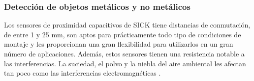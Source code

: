 %

\subsubsection{Detección de objetos metálicos y no metálicos}
\label{sec:sensores:cap:deteccion}

Los sensores de proximidad capacitivos de SICK tiene distancias de conmutación, 
de entre 1 y 25 mm, son aptos para prácticamente todo tipo de condiciones de 
montaje y les proporcionan una gran flexibilidad para utilizarlos en un gran 
número de aplicaciones. Además, estos sensores tienen una resistencia notable a 
las interferencias. La suciedad, el polvo y la niebla del aire ambiental les 
afectan tan poco como las interferencias electromagnéticas 
\cite{sensores:proximidad:capacitivos:sick}. \\

